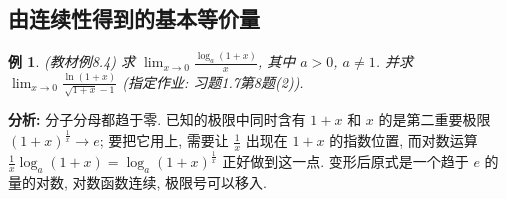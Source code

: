 \documentclass[UTF8,openany]{ctexbook}
\theoremstyle{chinesetextbook}
\newtheorem{example}{例}[section]
\begin{document}
\subsection{由连续性得到的基本等价量}
\begin{example}
\textnormal{(教材例8.4)} 求 $\displaystyle \lim_{x\to0}\frac{\log_a(1+x)}x$, 其中 $a>0$, $a\ne1$. 并求 $\displaystyle\lim_{x\to0}\frac{\ln(1+x)}{\sqrt{1+x}-1}$ (指定作业: 习题1.7第8题(2)).
\end{example}
\par\indent\textbf{分析:} 分子分母都趋于零. 已知的极限中同时含有 $1+x$ 和 $x$ 的是第二重要极限 $(1+x)^{\frac1x}\to e$; 要把它用上, 需要让 $\displaystyle\frac1x$ 出现在 $1+x$ 的指数位置, 而对数运算 $\displaystyle\frac1x\log_a(1+x)=\log_a(1+x)^{\frac1x}$ 正好做到这一点. 变形后原式是一个趋于 $e$ 的量的对数, 对数函数连续, 极限号可以移入.
\end{document}
